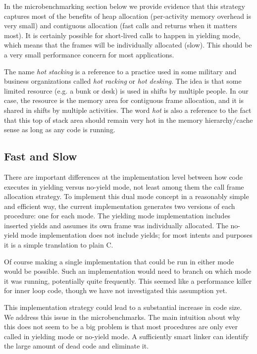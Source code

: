 \documentclass[10pt,preprint]{sigplanconf}
\begin{document}
In the microbenchmarking section below we provide evidence that this strategy captures most of the benefits of heap allocation (per-activity memory overhead is very small) and contiguous allocation (fast calls and returns when it matters most).
It is certainly possible for short-lived calls to happen in yielding mode, which means that the frames will be individually allocated (slow).
This should be a very small performance concern for most applications.

The name \emph{hot stacking} is a reference to a practice used in some military and business organizations called \emph{hot racking} or \emph{hot desking}.
The idea is that some limited resource (e.g. a bunk or desk) is used in shifts by multiple people.
In our case, the resource is the memory area for contiguous frame allocation, and it is shared in shifts by multiple activities.
The word \emph{hot} is also a reference to the fact that this top of stack area should remain very hot in the memory hierarchy/cache sense as long as any code is running.

\subsection{Fast and Slow}

There are important differences at the implementation level between how code executes in yielding versus no-yield mode, not least among them the call frame allocation strategy.
To implement this dual mode concept in a reasonably simple and efficient way, the current \charcoal{} implementation generates two versions of each procedure: one for each mode.
The yielding mode implementation includes inserted yields and assumes its own frame was individually allocated.
The no-yield mode implementation does not include yields; for most intents and purposes it is a simple translation to plain C.

Of course making a single implementation that could be run in either mode would be possible.
Such an implementation would need to branch on which mode it was running, potentially quite frequently.
This seemed like a performance killer for inner loop code, though we have not investigated this assumption yet.

This implementation strategy could lead to a substantial increase in code size.
We address this issue in the microbenchmarks.
The main intuition about why this does not seem to be a big problem is that most procedures are only ever called in yielding mode or no-yield mode.
A sufficiently smart linker can identify the large amount of dead code and eliminate it.
\end{document}
